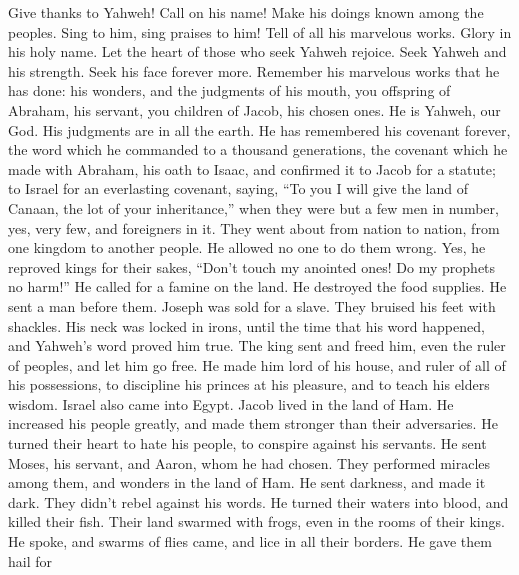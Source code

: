  Give thanks to Yahweh! Call on his name! Make his doings
known among the peoples.  Sing to him, sing praises to him!
Tell of all his marvelous works.  Glory in his holy name.
Let the heart of those who seek Yahweh rejoice.  Seek Yahweh
and his strength. Seek his face forever more.  Remember his
marvelous works that he has done: his wonders, and the judgments of his
mouth,  you offspring of Abraham, his servant, you children
of Jacob, his chosen ones.  He is Yahweh, our God. His
judgments are in all the earth.  He has remembered his
covenant forever, the word which he commanded to a thousand generations,
 the covenant which he made with Abraham, his oath to Isaac,
 and confirmed it to Jacob for a statute; to Israel for an
everlasting covenant,  saying, ``To you I will give the
land of Canaan, the lot of your inheritance,''  when they
were but a few men in number, yes, very few, and foreigners in it.
 They went about from nation to nation, from one kingdom to
another people.  He allowed no one to do them wrong. Yes,
he reproved kings for their sakes,  ``Don't touch my
anointed ones! Do my prophets no harm!''  He called for a
famine on the land. He destroyed the food supplies.  He
sent a man before them. Joseph was sold for a slave.  They
bruised his feet with shackles. His neck was locked in irons,
 until the time that his word happened, and Yahweh's word
proved him true.  The king sent and freed him, even the
ruler of peoples, and let him go free.  He made him lord of
his house, and ruler of all of his possessions,  to
discipline his princes at his pleasure, and to teach his elders wisdom.
 Israel also came into Egypt. Jacob lived in the land of
Ham.  He increased his people greatly, and made them
stronger than their adversaries.  He turned their heart to
hate his people, to conspire against his servants.  He sent
Moses, his servant, and Aaron, whom he had chosen.  They
performed miracles among them, and wonders in the land of Ham.
 He sent darkness, and made it dark. They didn't rebel
against his words.  He turned their waters into blood, and
killed their fish.  Their land swarmed with frogs, even in
the rooms of their kings.  He spoke, and swarms of flies
came, and lice in all their borders.  He gave them hail for
